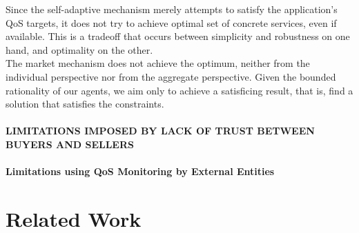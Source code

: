 \documentclass[10pt,journal,compsoc]{IEEEtran}
\begin{document}
Since the self-adaptive mechanism merely attempts to satisfy the application's QoS targets, it does not try to achieve  optimal set of concrete services, even if available. This is a tradeoff that occurs between simplicity and robustness on one hand, and optimality on the other.\\


The market mechanism does not achieve the optimum, neither from the individual perspective nor from the aggregate perspective. Given the bounded rationality of our agents, we aim only to achieve a satisficing result, that is, find a solution that satisfies the constraints. 

\paragraph{LIMITATIONS IMPOSED BY LACK OF TRUST BETWEEN BUYERS AND SELLERS}


\paragraph{Limitations using QoS Monitoring by External Entities}

\section{Related Work}
    
\end{document}
